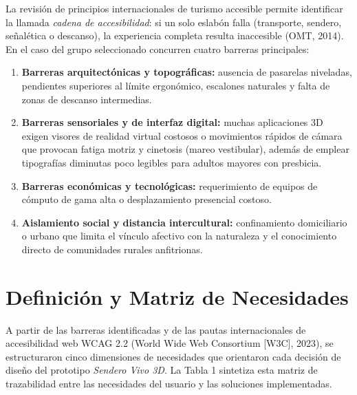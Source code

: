 \documentclass[12pt,letterpaper]{article}
\begin{document}
La revisión de principios internacionales de turismo accesible permite identificar la llamada \textit{cadena de accesibilidad}: si un solo eslabón falla (transporte, sendero, señalética o descanso), la experiencia completa resulta inaccesible (OMT, 2014). En el caso del grupo seleccionado concurren cuatro barreras principales:

\begin{enumerate}[leftmargin=2.2cm, itemsep=2pt]
  \item \textbf{Barreras arquitectónicas y topográficas:} ausencia de pasarelas niveladas, pendientes superiores al límite ergonómico, escalones naturales y falta de zonas de descanso intermedias.
  \item \textbf{Barreras sensoriales y de interfaz digital:} muchas aplicaciones 3D exigen visores de realidad virtual costosos o movimientos rápidos de cámara que provocan fatiga motriz y cinetosis (mareo vestibular), además de emplear tipografías diminutas poco legibles para adultos mayores con presbicia.
  \item \textbf{Barreras económicas y tecnológicas:} requerimiento de equipos de cómputo de gama alta o desplazamiento presencial costoso.
  \item \textbf{Aislamiento social y distancia intercultural:} confinamiento domiciliario o urbano que limita el vínculo afectivo con la naturaleza y el conocimiento directo de comunidades rurales anfitrionas.
\end{enumerate}

\section{Definición y Matriz de Necesidades}

A partir de las barreras identificadas y de las pautas internacionales de accesibilidad web WCAG 2.2 (World Wide Web Consortium [W3C], 2023), se estructuraron cinco dimensiones de necesidades que orientaron cada decisión de diseño del prototipo \textit{Sendero Vivo 3D}. La Tabla 1 sintetiza esta matriz de trazabilidad entre las necesidades del usuario y las soluciones implementadas.
\end{document}
